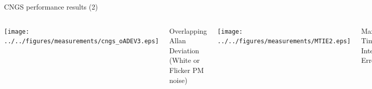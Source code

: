 \documentclass[compress,red]{beamer}
\begin{document}
\begin{frame}{CNGS performance results (2)}

  \begin{columns}[c]
		\begin{center}
		\texttt{[image: ../../figures/measurements/cngs\_oADEV3.eps]}
		\end{center}
		\begin{center}
		  Overlapping Allan Deviation \\
		  (White or Flicker PM noise)
		\end{center}


		\begin{center}
		\texttt{[image: ../../figures/measurements/MTIE2.eps]}
		\end{center}
		\begin{center}
		Maximum Time Interval Error
		\end{center}
  \end{columns}
  \begin{columns}[c]

  \end{columns}

\end{frame}
\end{document}
